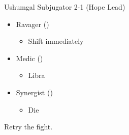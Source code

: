 \renewcommand{\first}{[1] Ravager (\rav)}
\renewcommand{\second}{[2] Medic (\med)}
\renewcommand{\third}{[3] Synergist (\syn)}
	\begin{battle}{Ushumgal Subjugator 2-1 (Hope Lead)}
		\begin{itemize}
			\item \first
			      \begin{itemize}
				      \item Shift immediately
			      \end{itemize}
			\item \second
			      \begin{itemize}
				      \item Libra
			      \end{itemize}
			\item \third
			      \begin{itemize}
				      \item Die
			      \end{itemize}
		\end{itemize}
	\end{battle}
	Retry the fight.
	\vfill

